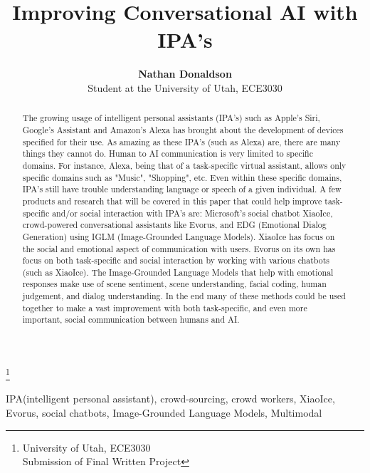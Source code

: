 \documentclass[letterpaper, 10 pt, conference]{IEEEtran}
\title{Improving Conversational AI with IPA's}
\author{\textbf{Nathan Donaldson}\\ Student at the University of Utah, ECE3030}
\begin{document}
 	

\maketitle
\makeatletter
\let\thefootnote\relax\footnote{{\noindent University of Utah, ECE3030\\Submission of Final Written Project}}

\def\ps@headings{
\def\@oddhead{\mbox{}\scriptsize\rightmark \hfil \thepage}
\def\@evenhead{\scriptsize\thepage \hfil \leftmark\mbox{}}
}
\makeatother
\pagestyle{headings}
\thispagestyle{headings}

\begin{abstract}
The growing usage of intelligent personal assistants (IPA's) such as Apple's Siri, Google's Assistant and Amazon's Alexa has brought about the development of devices specified for their use. As amazing as these IPA's (such as Alexa) are, there are many things they cannot do. Human to AI communication is very limited to specific domains. For instance, Alexa, being that of a task-specific virtual assistant, allows only specific domains such as "Music", "Shopping", etc. Even within these specific domains, IPA's still have trouble understanding language or speech of a given individual. A few products and research that will be covered in this paper that could help improve task-specific and/or social interaction with IPA's are: Microsoft's social chatbot XiaoIce, crowd-powered conversational assistants like Evorus, and EDG (Emotional Dialog Generation) using IGLM (Image-Grounded Language Models). XiaoIce has focus on the social and emotional aspect of communication with users. Evorus on its own has focus on both task-specific and social interaction by working with various chatbots (such as XiaoIce). The Image-Grounded Language Models that help with emotional responses make use of scene sentiment, scene understanding, facial coding, human judgement, and dialog understanding. In the end many of these methods could be used together to make a vast improvement with both task-specific, and even more important, social communication between humans and AI. 
\end{abstract}

\begin{IEEEkeywords}
IPA(intelligent personal assistant), crowd-sourcing, crowd workers, XiaoIce, Evorus, social chatbots, Image-Grounded Language Models, Multimodal
\end{IEEEkeywords}
\end{document}
